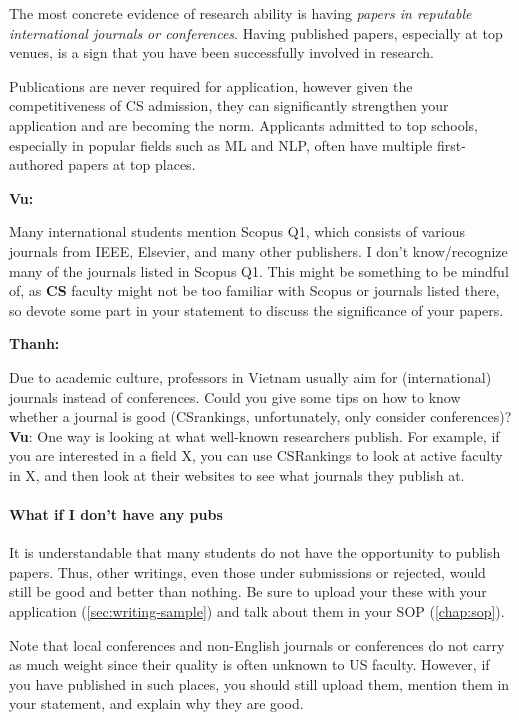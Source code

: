 \documentclass[oneside,11pt,dvipsnames]{book}
\newenvironment{commentbox}[1][]{
  \small
  \begin{mybox}
    {\small \textbf{#1}}
  }{
  \end{mybox}
}
\begin{document}
The most concrete evidence of research ability is having \emph{papers in reputable international journals or conferences}.
Having published papers, especially at top venues, is a sign that you have been successfully involved in research. 

Publications are never required for application, however given the competitiveness of CS admission, they can significantly strengthen your application and are becoming the norm. Applicants admitted to top schools, especially in popular fields such as ML and NLP, often have multiple first-authored papers at top places.

\begin{commentbox}[Vu:]
  Many international students mention Scopus Q1, which consists of various journals from IEEE, Elsevier, and many other publishers.  I don't know/recognize many of the journals listed in Scopus Q1. This might be something to be mindful of, as \textbf{CS} faculty might not be too familiar with Scopus or journals listed there, so devote some part in your statement to discuss the significance of your papers.
\end{commentbox}

\begin{commentbox}[Thanh:]
    Due to academic culture, professors in Vietnam usually aim for (international) journals instead of conferences. Could you give some tips on how to know whether a journal is good (CSrankings, unfortunately, only consider conferences)?
    \tcblower
    \textbf{Vu}: One way is looking at what well-known researchers publish. For example, if you are interested in a field X, you can use CSRankings to look at active faculty in X, and then look at their websites to see what journals they publish at.
\end{commentbox}

\paragraph{What if I don't have any pubs} It is understandable that many students do not have the opportunity to publish papers. Thus, other writings, even those under submissions or rejected, would still be good and better than nothing.  Be sure to upload your these with your application (\autoref{sec:writing-sample}) and talk about them in your SOP (\autoref{chap:sop}).  

Note that local conferences and non-English journals or conferences do
not carry as much weight since their quality is often unknown to US faculty. However, if you have published in such places, you should still upload them, mention them in your statement, and explain why they are good.
\end{document}
